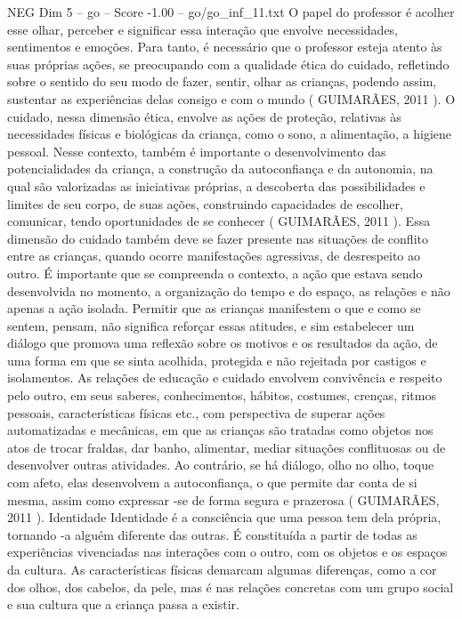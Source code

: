 \begin{textsample}{NEG Dim 5 – go – Score -1.00 – go/go\_inf\_11.txt}
O papel do professor é acolher esse olhar, perceber e significar essa interação que envolve necessidades, sentimentos e emoções.
Para tanto, é necessário que o professor esteja atento às suas próprias ações, se preocupando com a qualidade ética do cuidado, refletindo sobre o sentido do seu modo de fazer, sentir, olhar as crianças, podendo assim, sustentar as experiências delas consigo e com o mundo ( GUIMARÃES, 2011 ).
O cuidado, nessa dimensão ética, envolve as ações de proteção, relativas às necessidades físicas e biológicas da criança, como o sono, a alimentação, a higiene pessoal.
Nesse contexto, também é importante o desenvolvimento das potencialidades da criança, a construção da autoconfiança e da autonomia, na qual são valorizadas as iniciativas próprias, a descoberta das possibilidades e limites de seu corpo, de suas ações, construindo capacidades de escolher, comunicar, tendo oportunidades de se conhecer ( GUIMARÃES, 2011 ).
Essa dimensão do cuidado também deve se fazer presente nas situações de conflito entre as crianças, quando ocorre manifestações agressivas, de desrespeito ao outro.
É importante que se compreenda o contexto, a ação que estava sendo desenvolvida no momento, a organização do tempo e do espaço, as relações e não apenas a ação isolada.
Permitir que as crianças manifestem o que e como se sentem, pensam, não significa reforçar essas atitudes, e sim estabelecer um diálogo que promova uma reflexão sobre os motivos e os resultados da ação, de uma forma em que se sinta acolhida, protegida e não rejeitada por castigos e isolamentos.
As relações de educação e cuidado envolvem convivência e respeito pelo outro, em seus saberes, conhecimentos, hábitos, costumes, crenças, ritmos pessoais, características físicas etc., com perspectiva de superar ações automatizadas e mecânicas, em que as crianças são tratadas como objetos nos atos de trocar fraldas, dar banho, alimentar, mediar situações conflituosas ou de desenvolver outras atividades.
Ao contrário, se há diálogo, olho no olho, toque com afeto, elas desenvolvem a autoconfiança, o que permite dar conta de si mesma, assim como expressar -se de forma segura e prazerosa ( GUIMARÃES, 2011 ).
Identidade Identidade é a consciência que uma pessoa tem dela própria, tornando -a alguém diferente das outras.
É constituída a partir de todas as experiências vivenciadas nas interações com o outro, com os objetos e os espaços da cultura.
As características físicas demarcam algumas diferenças, como a cor dos olhos, dos cabelos, da pele, mas é nas relações concretas com um grupo social e sua cultura que a criança passa a existir.

\end{textsample}
